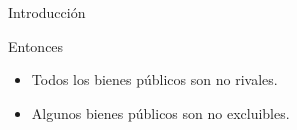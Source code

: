 \begin{frame}{Introducción}
	\begin{alertblock}{Entonces}
		\begin{itemize}
			\item Todos los bienes públicos son no rivales.
			\item Algunos bienes públicos son no excluibles.
		\end{itemize}
	\end{alertblock}
\end{frame}